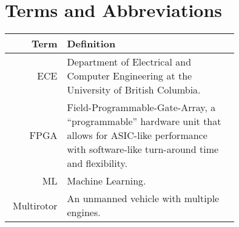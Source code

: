 \section*{Terms and Abbreviations}\label{sec:terms}

\begin{tabular}[h]{rp{0.75\linewidth}}
    \hline
    \textbf{Term} & \textbf{Definition}\\
    \hline

    ECE & Department of Electrical and Computer Engineering at the University of British Columbia.\\
    FPGA & Field-Programmable-Gate-Array, a ``programmable'' hardware unit that allows for ASIC-like performance with software-like turn-around time and flexibility.\\
    ML & Machine Learning.\\
    Multirotor & An unmanned vehicle with multiple engines. \\

\end{tabular}
